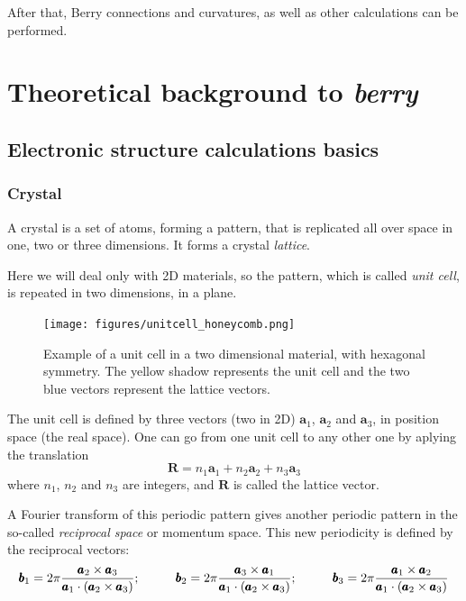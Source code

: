 \documentclass[a4paper,12pt]{report}
\begin{document}
After that, Berry connections and curvatures, as well as other calculations can be performed.
















\chapter{Theoretical background to \emph{berry}}

\section{Electronic structure calculations basics}

\subsection*{Crystal}
A crystal is a set of atoms, forming a pattern, that is replicated all over space in one, two or three dimensions.
It forms a crystal \emph{lattice}.

Here we will deal only with 2D materials, so the pattern, which is called \emph{unit cell},
is repeated in two dimensions, in a plane.

\begin{figure}
 \centering
 \texttt{[image: figures/unitcell\_honeycomb.png]}
 \caption{Example of a unit cell in a two dimensional material, with hexagonal symmetry.
 The yellow shadow represents the unit cell and the two blue vectors represent the lattice vectors.}
 \label{fig:unitcell}
\end{figure}

The unit cell is defined by three vectors (two in 2D) $\pmb{a}_1$, $\pmb{a}_2$ and $\pmb{a}_3$,
in position space (the real space).
One can go from one unit cell to any other one by aplying the translation
\begin{equation}
 \pmb{R} = n_1\pmb{a}_1 + n_2\pmb{a}_2 + n_3\pmb{a}_3
\end{equation}
where $n_1$, $n_2$ and $n_3$ are integers, and $\pmb{R}$ is called the lattice vector.

A Fourier transform of this periodic pattern gives another periodic pattern in the so-called
\emph{reciprocal space} or momentum space.
This new periodicity is defined by the reciprocal vectors:
\begin{equation*}
 \pmb{b}_1 = 2\pi\dfrac{\pmb{a}_2\times\pmb{a}_3}{\pmb{a}_1\cdot (\pmb{a}_2\times\pmb{a}_3)};\hspace*{1cm}
 \pmb{b}_2 = 2\pi\dfrac{\pmb{a}_3\times\pmb{a}_1}{\pmb{a}_1\cdot (\pmb{a}_2\times\pmb{a}_3)};\hspace*{1cm}
 \pmb{b}_3 = 2\pi\dfrac{\pmb{a}_1\times\pmb{a}_2}{\pmb{a}_1\cdot (\pmb{a}_2\times\pmb{a}_3)}
\end{equation*}
\end{document}
